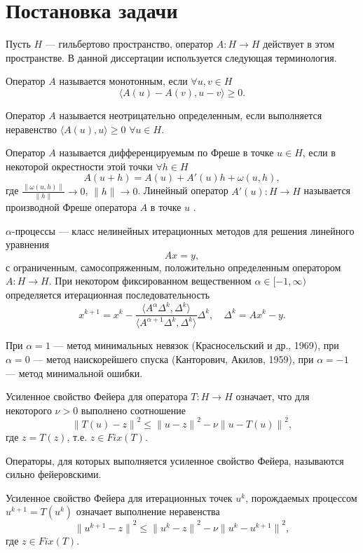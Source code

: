 \section{Постановка задачи}
Пусть $H$ --- гильбертово пространство, оператор $A: H \to H$ действует в этом пространстве. В данной диссертации используется следующая терминология.
\begin{definition}
	Оператор $A$ называется монотонным, если $\forall u,v\in H$ $$\langle A(u)-A(v), u-v\rangle \geqslant 0.$$
\end{definition}
\begin{definition}
	Оператор $A$ называется неотрицательно определенным, если выполняется неравенство $\langle A(u), u \rangle \geqslant 0$ $\forall u\in H$.
\end{definition}
\begin{definition}
	Оператор $A$ называется дифференцируемым по Фреше в точке $u\in H$, если в некоторой окрестности этой точки $\forall h\in H$
	$$A(u+h)=A(u)+A'(u)h+\omega(u,h),$$
	где $\frac{\|\omega(u,h)\|}{\|h\|}\to 0$, $\|h\|\to 0$.
	Линейный оператор $A'(u):H \to H$ называется производной Фреше оператора $A$ в точке $u$ .
\end{definition}
\begin{definition}
	$\alpha$-процессы --- класс нелинейных итерационных методов для решения линейного уравнения
	$$Ax=y,$$
	с ограниченным, самосопряженным, положительно определенным оператором $A:H\to H$. При некотором фиксированном вещественном $\alpha \in [-1, \infty)$ определяется итерационная последовательность
		$$x^{k+1}=x^k-\frac{\langle A^\alpha\Delta^k, \Delta^k \rangle}{\langle A^{\alpha +1}\Delta^k, \Delta^k\rangle}\Delta^k,\quad \Delta^k=Ax^k-y.$$
\end{definition}
При $\alpha=1$ --- метод минимальных невязок (Красносельский и др., 1969), при $\alpha=0$ --- метод наискорейшего спуска (Канторович, Акилов, 1959), при $\alpha=-1$ --- метод минимальной ошибки.
\begin{definition}
	Усиленное свойство Фейера \cite{VasEre2009} для оператора $T: H \to H$ означает, что для некоторого $\nu>0$ выполнено соотношение
	\begin{equation}\label{fejer_prop_uni}
	{\|T(u)-z\|}^2\le{\|u-z\|}^2-\nu{\|u-T(u)\|}^2,
	\end{equation}
	где $z=T(z)$, т.е. $z\in Fix(T)$. 
\end{definition}
Операторы, для которых выполняется усиленное свойство Фейера, называются сильно фейеровскими.
\begin{definition}
	Усиленное свойство Фейера для итерационных точек $u^k$, порождаемых процессом $u^{k+1}=T(u^k)$ означает выполнение неравенства
	\begin{equation}\label{fejer_prop_it}
	{\|u^{k+1}-z\|}^2\le{\|u^k-z\|}^2-\nu{\|u^k-u^{k+1}\|}^2,
	\end{equation}
	где $z\in Fix(T)$.
\end{definition}

